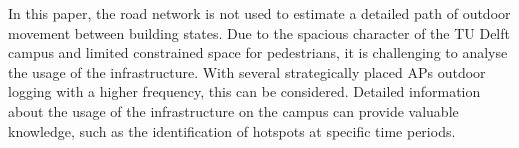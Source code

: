 In this paper, the road network is not used to estimate a detailed path of outdoor movement between building states. Due to the spacious character of the TU Delft campus and limited constrained space for pedestrians, it is challenging to analyse the usage of the infrastructure. With several strategically placed APs outdoor logging with a higher frequency, this can be considered. Detailed information about the usage of the infrastructure on the campus can provide valuable knowledge, such as the identification of hotspots at specific time periods. 

